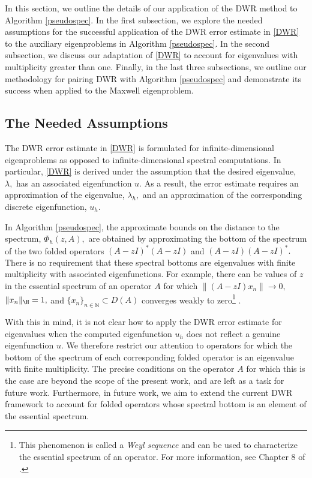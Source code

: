 In this section, we outline the details of our application of the DWR method to Algorithm \ref{pseudospec}. In the first subsection, we explore the needed assumptions for the successful application of the DWR error estimate in \eqref{DWR} to the auxiliary eigenproblems in Algorithm \ref{pseudospec}. In the second subsection, we discuss our adaptation of \eqref{DWR} to account for eigenvalues with multiplicity greater than one. Finally, in the last three subsections, we outline our methodology for pairing DWR with Algorithm \ref{pseudospec} and demonstrate its success when applied to the Maxwell eigenproblem. 


\subsection{The Needed Assumptions}\label{ASSUMPSect}

The DWR error estimate in \eqref{DWR} is formulated for infinite-dimensional eigenproblems as opposed to infinite-dimensional spectral computations. In particular, \eqref{DWR} is derived under the assumption that the desired eigenvalue, $\lambda,$ has an associated eigenfunction $u.$ As a result, the error estimate requires an approximation of the eigenvalue, $\lambda_h,$ and an approximation of the corresponding discrete eigenfunction, $u_h$. 

In Algorithm \ref{pseudospec}, the approximate bounds on the distance to the spectrum, $\Phi_h(z, A),$ are obtained by approximating the bottom of the spectrum of the two folded operators $(A-zI)^*(A-zI)$ and $(A-zI)(A-zI)^*.$ There is no requirement that these spectral bottoms are eigenvalues with finite multiplicity with associated eigenfunctions. For example, there can be values of $z$ in the essential spectrum of an operator $A$ for which $\|(A-zI)x_n\| \rightarrow 0,$ $\|x_n\|_{\H} = 1,$ and $\{x_n\}_{n\in \mathbb{N}} \subset D(A)$ converges weakly to zero\footnote{This phenomenon is called a \textit{Weyl sequence} and can be used to characterize the essential spectrum of an operator. For more information, see Chapter 8 of \cite{Matt}.} \cite{Matt}. 

With this in mind, it is not clear how to apply the DWR error estimate for eigenvalues when the computed eigenfunction $u_h$ does not reflect a genuine eigenfunction $u.$ We therefore restrict our attention to operators for which the bottom of the spectrum of each corresponding folded operator is an eigenvalue with finite multiplicity. The precise conditions on the operator $A$ for which this is the case are beyond the scope of the present work, and are left as a task for future work. Furthermore, in future work, we aim to extend the current DWR framework to account for folded operators whose spectral bottom is an element of the essential spectrum.


